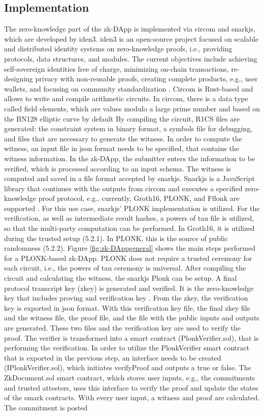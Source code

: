 \subsection{Implementation}
The zero-knowledge part of the zk-DApp is implemented via circom and snarkjs, which are developed by iden3. iden3 is an open-source project focused on scalable and distributed identity systems on zero-knowledge proofs, i.e., providing protocols, data structures, and modules. The current objectives include achieving self-sovereign identities free of charge, minimizing on-chain transactions, re-designing privacy with non-reusable proofs, creating complete products, e.g., user wallets, and focusing on community standardization \citep{iden3aboutus}. Circom is Rust-based and allows to write and compile arithmetic circuits. In circom, there is a data type called field elements, which are values modulo a large prime number and based on the BN128 elliptic curve by default \citep{circom} By compiling the circuit, R1CS files are generated: the constraint system in binary format, a symbols file for debugging, and files that are necessary to generate the witness. In order to compute the witness, an input file in json format needs to be specified, that contains the witness information. In the zk-DApp, the submitter enters the information to be verified, which is processed according to an input schema. The witness is computed and saved in a file format accepted by snarkjs. Snarkjs is a JavaScript library that continues with the outputs from circom and executes a specified zero-knowledge proof protocol, e.g., currently, Groth16, PLONK, and Fflonk are supported \citep{snarkjsdoc}. For this use case, snarkjs' PLONK implementation is utilized. For the verification, as well as intermediate result hashes, a powers of tau file is utilized, so that the multi-party computation can be performed. In Groth16, it is utilized during the trusted setup (5.2.1). In PLONK, this is the source of public randomness (5.2.2). Figure \ref{fig:zk-DAppgeneral} shows the main steps performed for a PLONK-based zk-DApp. PLONK does not require a trusted ceremony for each circuit, i.e., the powers of tau ceremony is universal. After compiling the circuit and calculating the witness, the snarkjs Plonk can be setup. A final protocol transcript key (zkey) is generated and verified. It is the zero-knowledge key that includes proving and verification key \citep{snarkjsdoc}. From the zkey, the verification key is exported in json format. With this verification key file, the final zkey file and the witness file, the proof file, and the file with the public inputs and outputs are generated. These two files and the verification key are used to verify the proof. The verifier is transformed into a smart contract (PlonkVerifier.sol), that is performing the verification. In order to utilize the PlonkVerifier smart contract that is exported in the previous step, an interface needs to be created (IPlonkVerifier.sol), which initiates verifyProof and outputs a true or false. The ZkDocument.sol smart contract, which stores user inputs, e.g., the commitments and trusted attesters, uses this interface to verify the proof and update the states of the smark contracts. With every user input, a witness and proof are calculated. The commitment is posted 